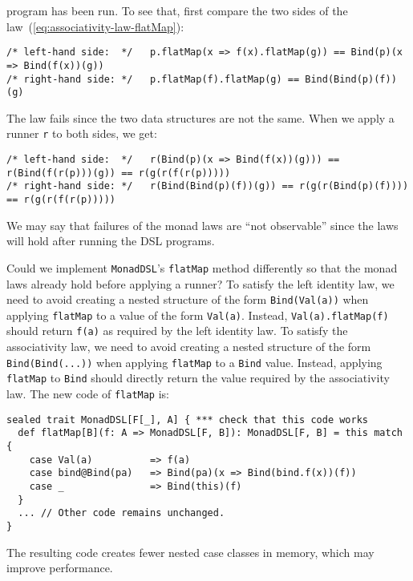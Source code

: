 program has been run. To see that, first compare the two sides of
the law~(\ref{eq:associativity-law-flatMap}):
\begin{lstlisting}
/* left-hand side:  */   p.flatMap(x => f(x).flatMap(g)) == Bind(p)(x => Bind(f(x))(g))
/* right-hand side: */   p.flatMap(f).flatMap(g) == Bind(Bind(p)(f))(g)
\end{lstlisting}
The law fails since the two data structures are not the same. When
we apply a runner \lstinline!r!
to both sides, we get:
\begin{lstlisting}
/* left-hand side:  */   r(Bind(p)(x => Bind(f(x))(g))) == r(Bind(f(r(p)))(g)) == r(g(r(f(r(p)))))  
/* right-hand side: */   r(Bind(Bind(p)(f))(g)) == r(g(r(Bind(p)(f)))) == r(g(r(f(r(p)))))
\end{lstlisting}
We may say that failures of the monad laws are \textsf{``}not observable\textsf{''}
since the laws will hold after running the DSL programs.

Could we implement \lstinline!MonadDSL!\textsf{'}s
\lstinline!flatMap! method
differently so that the monad laws already hold before applying a
runner? To satisfy the left identity law, we need to avoid creating
a nested structure of the form \lstinline!Bind(Val(a))!
when applying \lstinline!flatMap!
to a value of the form \lstinline!Val(a)!.
Instead, \lstinline!Val(a).flatMap(f)!
should return \lstinline!f(a)!
as required by the left identity law. To satisfy the associativity
law, we need to avoid creating a nested structure of the form \lstinline!Bind(Bind(...))!
when applying \lstinline!flatMap!
to a \lstinline!Bind! value.
Instead, applying \lstinline!flatMap!
to \lstinline!Bind! should
directly return the value required by the associativity law. The new
code of \lstinline!flatMap!
is:
\begin{lstlisting}
sealed trait MonadDSL[F[_], A] { *** check that this code works
  def flatMap[B](f: A => MonadDSL[F, B]): MonadDSL[F, B] = this match {
    case Val(a)          => f(a)
    case bind@Bind(pa)   => Bind(pa)(x => Bind(bind.f(x))(f))
    case _               => Bind(this)(f)
  }
  ... // Other code remains unchanged.
}
\end{lstlisting}
The resulting code creates fewer nested case classes in memory, which
may improve performance.

